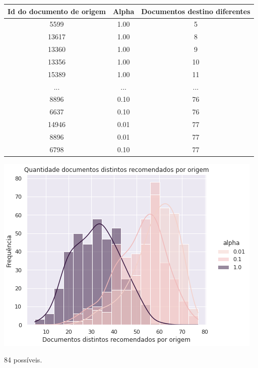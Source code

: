\begin{center}
    \begin{tabular}{|c|c|c|}
        \hline
        Id do documento de origem & Alpha & Documentos destino diferentes \\
        \hline
        5599 & 1.00 & 5 \\
        \hline
        13617 & 1.00 & 8 \\
        \hline
        13360 & 1.00 & 9 \\
        \hline
        13356 & 1.00 & 10 \\
        \hline
        15389 & 1.00 & 11 \\
        \hline
        ... & ... & ... \\
        \hline
        8896 & 0.10 & 76 \\
        \hline
        6637 & 0.10 & 76 \\
        \hline
        14946 & 0.01 & 77 \\
        \hline
        8896 & 0.01 & 77 \\
        \hline
        6798 & 0.10 & 77 \\
        \hline
    \end{tabular}
\end{center}

\includegraphics[scale=0.7]{resultados/resources/distribuicao_semelhantes_distintos_alpha.png}

84 possíveis.

